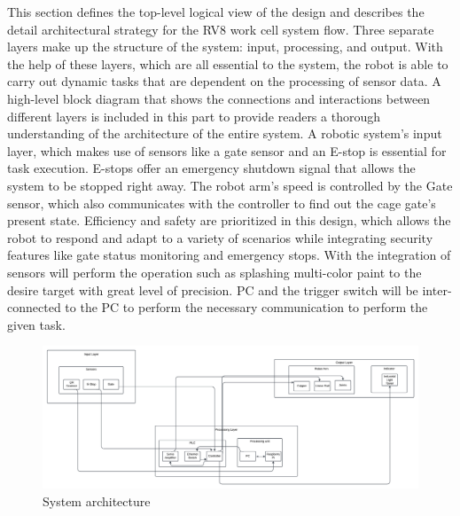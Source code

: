 This section defines the top-level logical view of the design and describes the detail architectural strategy for the RV8 work cell system flow. Three separate layers make up the structure of the system: input, processing, and output. With the help of these layers, which are all essential to the system, the robot is able to carry out dynamic tasks that are dependent on the processing of sensor data. A high-level block diagram that shows the connections and interactions between different layers is included in this part to provide readers a thorough understanding of the architecture of the entire system. A robotic system's input layer, which makes use of sensors like a gate sensor and an E-stop is essential for task execution. E-stops offer an emergency shutdown signal that allows the system to be stopped right away. The robot arm's speed is controlled by the Gate sensor, which also communicates with the controller to find out the cage gate's present state. Efficiency and safety are prioritized in this design, which allows the robot to respond and adapt to a variety of scenarios while integrating security features like gate status monitoring and emergency stops. With the integration of sensors will perform the operation such as splashing multi-color paint to the desire target with great level of precision. PC and the trigger switch will be inter-connected to the PC to perform the necessary communication to perform the given task.  

\begin{figure}[h!]
	\centering
 	\includegraphics[width=1\textwidth]{images/system_subystem.png}
 \caption{System architecture}
\end{figure}

